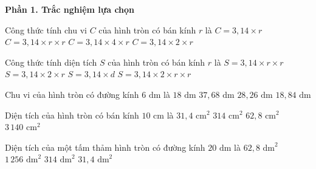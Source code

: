 \textbf{Phần 1. Trắc nghiệm lựa chọn}

\begin{ex} %
Công thức tính chu vi $C$ của hình tròn có bán kính $r$ là
\choice
{$C = 3{,}14 \times r$}
{$C = 3{,}14 \times r \times r$}
{$C = 3{,}14 \times 4 \times r$}
{\True $C = 3{,}14 \times 2 \times r$}
\end{ex}

\begin{ex} %
Công thức tính diện tích $S$ của hình tròn có bán kính $r$ là
\choice
{\True $S = 3{,}14 \times r \times r$}
{$S = 3{,}14 \times 2 \times r$}
{$S = 3{,}14 \times d$}
{$S = 3{,}14 \times 2 \times r \times r$}
\end{ex}

\begin{ex} %
Chu vi của hình tròn có đường kính $6\text{ dm}$ là
\choice
{$18\text{ dm}$}
{$37{,}68\text{ dm}$}
{$28{,}26\text{ dm}$}
{\True $18{,}84\text{ dm}$}
\end{ex}

\begin{ex} %
Diện tích của hình tròn có bán kính $10\text{ cm}$ là
\choice
{$31{,}4\text{ cm}^2$}
{\True $314\text{ cm}^2$}
{$62{,}8\text{ cm}^2$}
{$3\,140\text{ cm}^2$}
\end{ex}

\begin{ex} %
Diện tích của một tấm thảm hình tròn có đường kính $20\text{ dm}$ là
\choice
{$62{,}8\text{ dm}^2$}
{$1\,256\text{ dm}^2$}
{\True $314\text{ dm}^2$}
{$31{,}4\text{ dm}^2$}
\end{ex}

